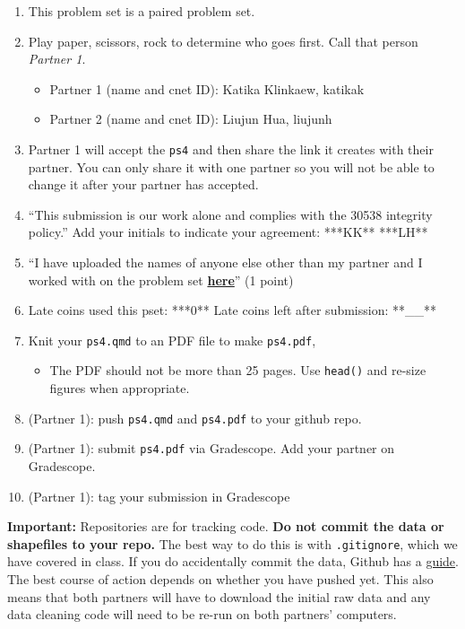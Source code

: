\documentclass[
  letterpaper,
  DIV=11,
  numbers=noendperiod]{scrartcl}
\providecommand{\tightlist}{%
  \setlength{\itemsep}{0pt}\setlength{\parskip}{0pt}}\usepackage{longtable,booktabs,array}
\begin{document}
\begin{enumerate}
\def\labelenumi{\arabic{enumi}.}
\tightlist
\item
  This problem set is a paired problem set.
\item
  Play paper, scissors, rock to determine who goes first. Call that
  person \emph{Partner 1}.

  \begin{itemize}
  \tightlist
  \item
    Partner 1 (name and cnet ID): Katika Klinkaew, katikak
  \item
    Partner 2 (name and cnet ID): Liujun Hua, liujunh
  \end{itemize}
\item
  Partner 1 will accept the \texttt{ps4} and then share the link it
  creates with their partner. You can only share it with one partner so
  you will not be able to change it after your partner has accepted.
\item
  ``This submission is our work alone and complies with the 30538
  integrity policy.'' Add your initials to indicate your agreement:
  ***KK** ***LH**
\item
  ``I have uploaded the names of anyone else other than my partner and I
  worked with on the problem set
  \textbf{\href{https://docs.google.com/forms/d/185usrCREQaUbvAXpWhChkjghdGgmAZXA3lPWpXLLsts/edit}{here}}''
  (1 point)
\item
  Late coins used this pset: ***0** Late coins left after submission:
  **\_\_**
\item
  Knit your \texttt{ps4.qmd} to an PDF file to make \texttt{ps4.pdf},

  \begin{itemize}
  \tightlist
  \item
    The PDF should not be more than 25 pages. Use \texttt{head()} and
    re-size figures when appropriate.
  \end{itemize}
\item
  (Partner 1): push \texttt{ps4.qmd} and \texttt{ps4.pdf} to your github
  repo.
\item
  (Partner 1): submit \texttt{ps4.pdf} via Gradescope. Add your partner
  on Gradescope.
\item
  (Partner 1): tag your submission in Gradescope
\end{enumerate}

\textbf{Important:} Repositories are for tracking code. \textbf{Do not
commit the data or shapefiles to your repo.} The best way to do this is
with \texttt{.gitignore}, which we have covered in class. If you do
accidentally commit the data, Github has a
\href{https://docs.github.com/en/repositories/working-with-files/managing-large-files/about-large-files-on-github\#removing-files-from-a-repositorys-history}{guide}.
The best course of action depends on whether you have pushed yet. This
also means that both partners will have to download the initial raw data
and any data cleaning code will need to be re-run on both partners'
computers.
\end{document}
